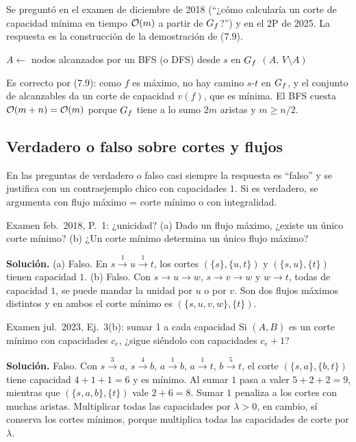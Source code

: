 Se preguntó en el examen de diciembre de 2018 (``¿cómo calcularía un corte de capacidad mínima en tiempo $\mathcal{O}(m)$ a partir de $G_f$?'') y en el 2P de 2025. La respuesta es la construcción de la demostración de (7.9).

\begin{algorithmic}[1]
 
  \State $A\gets$ nodos alcanzados por un BFS (o DFS) desde $s$ en $G_f$
  \State \Return $(A,\,V\setminus A)$
\EndFunction
\end{algorithmic}

Es correcto por (7.9): como $f$ es máximo, no hay camino $s$-$t$ en $G_f$, y el conjunto de alcanzables da un corte de capacidad $v(f)$, que es mínima. El BFS cuesta $\mathcal{O}(m+n)=\mathcal{O}(m)$ porque $G_f$ tiene a lo sumo $2m$ aristas y $m\ge n/2$.

\subsection{Verdadero o falso sobre cortes y flujos}

En las preguntas de verdadero o falso casi siempre la respuesta es ``falso'' y se justifica con un contraejemplo chico con capacidades $1$. Si es verdadero, se argumenta con flujo máximo = corte mínimo o con integralidad.

\begin{problema}{Examen feb.~2018, P.~1: ¿unicidad?}
(a) Dado un flujo máximo, ¿existe un único corte mínimo? (b) ¿Un corte mínimo determina un único flujo máximo?

\smallskip
\textbf{Solución.} (a) Falso. En $s\xrightarrow{1}u\xrightarrow{1}t$, los cortes $(\{s\},\{u,t\})$ y $(\{s,u\},\{t\})$ tienen capacidad $1$. (b) Falso. Con $s\to u\to w$, $s\to v\to w$ y $w\to t$, todas de capacidad $1$, se puede mandar la unidad por $u$ o por $v$. Son dos flujos máximos distintos y en ambos el corte mínimo es $(\{s,u,v,w\},\{t\})$.
\end{problema}

\begin{problema}{Examen jul.~2023, Ej.~3(b): sumar 1 a cada capacidad}
Si $(A,B)$ es un corte mínimo con capacidades $c_e$, ¿sigue siéndolo con capacidades $c_e+1$?

\smallskip
\textbf{Solución.} Falso. Con $s\xrightarrow{3}a$, $s\xrightarrow{4}b$, $a\xrightarrow{1}b$, $a\xrightarrow{1}t$, $b\xrightarrow{5}t$, el corte $(\{s,a\},\{b,t\})$ tiene capacidad $4+1+1=6$ y es mínimo. Al sumar $1$ pasa a valer $5+2+2=9$, mientras que $(\{s,a,b\},\{t\})$ vale $2+6=8$. Sumar $1$ penaliza a los cortes con muchas aristas. Multiplicar todas las capacidades por $\lambda>0$, en cambio, sí conserva los cortes mínimos, porque multiplica todas las capacidades de corte por $\lambda$.
\end{problema}

